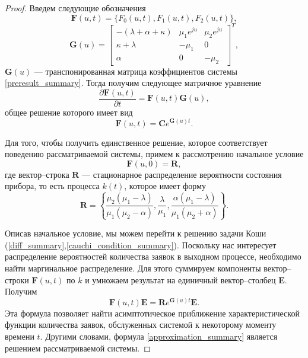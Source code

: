 \begin{proof}
	Введем следующие обозначения
	\begin{equation*}
		\boldsymbol{F}(u,t) = \{F_{0}(u,t),F_{1}(u,t),F_{2}(u,t)\},
	\end{equation*}  
	\begin{equation*}
		\boldsymbol{G}(u)=\begin{bmatrix}
			-(\lambda + \alpha + \kappa) & \mu_{1}e^{ju} &  \mu_{2}e^{ju}\\
			\kappa+\lambda & -\mu_{1} & 0\\
			\alpha & 	0 &	-\mu_{2}
		\end{bmatrix}^{T},
	\end{equation*}
	$\boldsymbol{G}(u)$ --- транспонированная матрица коэффициентов системы \eqref{preresult_summary}.
	Тогда получим следующее матричное уравнение
	\begin{equation*}
		\frac{{\partial \boldsymbol{F}(u,t)}}{{\partial t}} =\boldsymbol{F}(u,t)\boldsymbol{G}(u),
	\end{equation*}
	общее решение которого имеет вид
	\begin{equation} \label{diff_summary}
		\boldsymbol{F}(u,t)=\boldsymbol{C}e^{\boldsymbol{G}(u)t}.
	\end{equation}

	Для того, чтобы получить единственное решение, которое соответствует поведению рассматриваемой системы, примем к рассмотрению начальное условие
	\begin{equation} \label{cauchi_condition_summary}
		\boldsymbol{F}(u,0)=\boldsymbol{R},
	\end{equation}
	где вектор--строка $\boldsymbol{R}$ --- стационарное распределение вероятности состояния прибора, то есть процесса $k(t)$, которое имеет форму \cite{nazarov2017asymptotic}
	\begin{equation*}
		\boldsymbol{R}=\left\{\frac{\mu_{2}(\mu_{1} - \lambda)}{\mu_{1}(\mu_{2} - \alpha)},\frac{\lambda}{\mu_{1}},\frac{\alpha(\mu_{1} - \lambda)}{\mu_{1}(\mu_{2} + \alpha)}\right\}.
	\end{equation*}

	Описав начальное условие, мы можем перейти к решению задачи Коши (\ref{diff_summary},\ref{cauchi_condition_summary}).
	Поскольку нас интересует распределение вероятностей количества заявок в выходном процессе, необходимо найти маргинальное распределение. Для этого суммируем компоненты вектор--строки $\boldsymbol{F}(u,t)$ по $k$ и умножаем результат на единичный вектор--столбец $\boldsymbol{E}$. Получим
	\begin{equation}\label{approximation_summary}
		\boldsymbol{F}(u,t)\boldsymbol{E}=\boldsymbol{R}e^{\boldsymbol{G}(u)t}\boldsymbol{E}.
	\end{equation}
	Эта формула позволяет найти асимптотическое приближение характеристической функции количества заявок, обслуженных системой к некоторому моменту времени $t$. Другими словами, формула \eqref{approximation_summary} является решением рассматриваемой системы. 
\end{proof}


